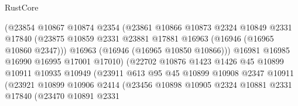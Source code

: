 \begin{lexlean}{RustCore}
\begin{coremodule}
                                  (@23854
                                    @10867
                                    @10874
                                    @2354
                                    (@23861
                                      @10866
                                      @10873
                                      @2324
                                      @10849
                                      @2331
                                      @17840
                                      (@23875
                                        @10859
                                        @2331
                                        @23881
                                        @17881
                                        @16963
                                        (@16946 (@16965 @10860 @2347)))
                                      @16963
                                      (@16946 (@16965 @10850 @10866)))
                                    @16981
                                    @16985
                                    @16990
                                    @16995
                                    @17001
                                    @17010)
                                  (@22702
                                    @10876
                                    @1423
                                    @1426
                                    @45
                                    @10899
                                    @10911
                                    @10935
                                    @10949
                                    (@23911
                                      @613
                                      @95
                                      @45
                                      @10899
                                      @10908
                                      @2347
                                      @10911
                                      (@23921
                                        @10899
                                        @10906
                                        @2414
                                        (@23456
                                          @10898
                                          @10905
                                          @2324
                                          @10881
                                          @2331
                                          @17840
                                          (@23470
                                            @10891
                                            @2331

\end{coremodule}
\end{lexlean}
